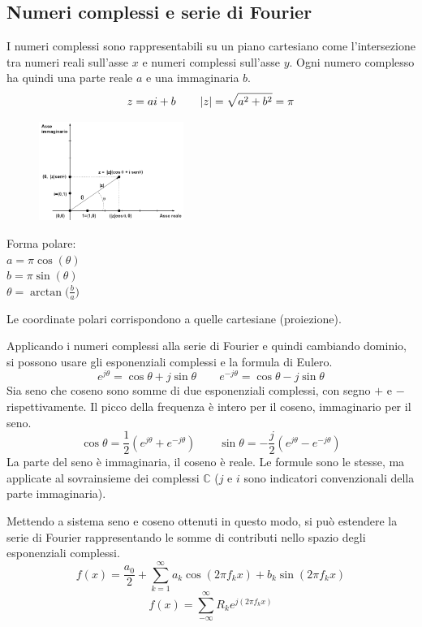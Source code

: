 \subsection{Numeri complessi e serie di Fourier}
I numeri complessi sono rappresentabili su un piano cartesiano come l'intersezione tra numeri reali sull'asse $x$ e numeri complessi sull'asse $y$. Ogni numero complesso ha quindi una parte reale $a$ e una immaginaria $b$.
$$z = ai+b \qquad \left|z\right| = \sqrt{a^2 + b^2} = \pi$$

\begin{figure}
	\vspace{-15pt}
		\includegraphics[width=0.42\textwidth]{Lezioni/Immagini/cartesiano}
	\vspace{-30pt}
\end{figure}

Forma polare:  \\ 
$a = \pi\cos(\theta)$ \\ 
$b = \pi\sin(\theta)$ \\ 
$\theta = \arctan\Big(\frac{b}{a}\Big)$

Le coordinate polari corrispondono a quelle cartesiane (proiezione). 

Applicando i numeri complessi alla serie di Fourier e quindi cambiando dominio, si possono usare gli esponenziali complessi e la formula di Eulero. 
$$e^{j\theta} = \cos\theta + j\sin\theta \qquad e^{-j\theta} = \cos\theta - j\sin\theta$$
Sia seno che coseno sono somme di due esponenziali complessi, con segno $+$ e $-$ rispettivamente. Il picco della frequenza è intero per il coseno, immaginario per il seno. 
$$\cos\theta = \frac{1}{2}(e^{j\theta} + e^{-j\theta}) \qquad \sin\theta = -\frac{j}{2}(e^{j\theta} - e^{-j\theta})$$
La parte del seno è immaginaria, il coseno è reale. Le formule sono le stesse, ma applicate al sovrainsieme dei complessi $\mathbb{C}$ ($j$ e $i$ sono indicatori convenzionali della parte immaginaria).

Mettendo a sistema seno e coseno ottenuti in questo modo, si può estendere la serie di Fourier rappresentando le somme di contributi nello spazio degli esponenziali complessi.
$$f(x) = \frac{a_0}{2} + \sum_{k=1}^{\infty} a_k \cos(2\pi f_kx) + b_k\sin(2\pi f_kx)$$
$$f(x) = \sum_{-\infty}^{\infty} R_ke^{j(2\pi f_kx)}$$

